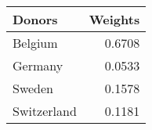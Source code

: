 \begin{tabular}{lr}
\toprule
     Donors &  Weights \\
\midrule
    Belgium &   0.6708 \\
    Germany &   0.0533 \\
     Sweden &   0.1578 \\
Switzerland &   0.1181 \\
\bottomrule
\end{tabular}
